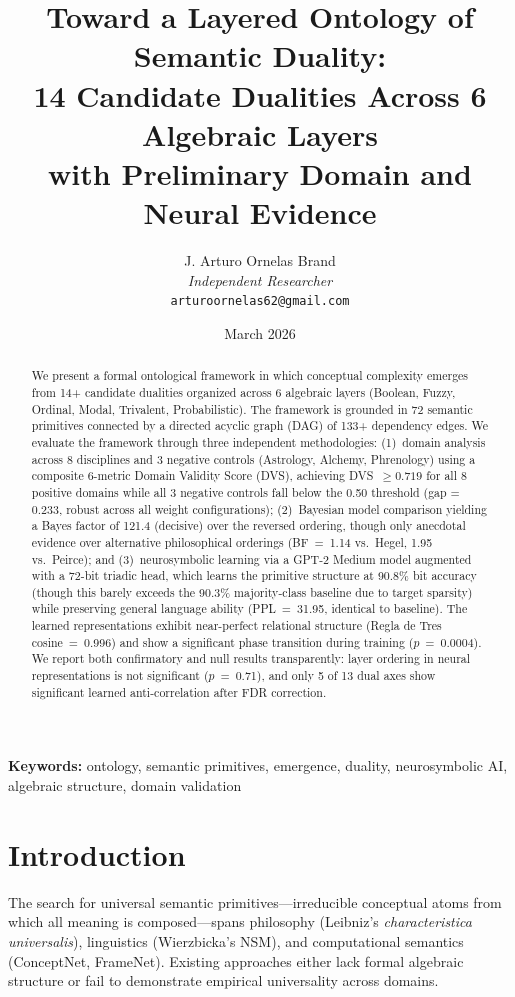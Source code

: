 \documentclass[11pt, a4paper]{article}
\title{\Large Toward a Layered Ontology of Semantic Duality:\\
14 Candidate Dualities Across 6 Algebraic Layers\\
with Preliminary Domain and Neural Evidence}
\author{
    J. Arturo Ornelas Brand \\
    \textit{Independent Researcher} \\
    \texttt{arturoornelas62@gmail.com}
}
\date{March 2026}
\begin{document}
\maketitle

\begin{abstract}
We present a formal ontological framework in which conceptual complexity emerges from 14+ candidate dualities organized across 6 algebraic layers (Boolean, Fuzzy, Ordinal, Modal, Trivalent, Probabilistic). The framework is grounded in 72 semantic primitives connected by a directed acyclic graph (DAG) of 133+ dependency edges. We evaluate the framework through three independent methodologies: (1)~domain analysis across 8 disciplines and 3 negative controls (Astrology, Alchemy, Phrenology) using a composite 6-metric Domain Validity Score (DVS), achieving DVS~$\geq 0.719$ for all 8 positive domains while all 3 negative controls fall below the 0.50 threshold (gap = 0.233, robust across all weight configurations); (2)~Bayesian model comparison yielding a Bayes factor of 121.4 (decisive) over the reversed ordering, though only anecdotal evidence over alternative philosophical orderings (BF~=~1.14 vs.\ Hegel, 1.95 vs.\ Peirce); and (3)~neurosymbolic learning via a GPT-2 Medium model augmented with a 72-bit triadic head, which learns the primitive structure at 90.8\% bit accuracy (though this barely exceeds the 90.3\% majority-class baseline due to target sparsity) while preserving general language ability (PPL~=~31.95, identical to baseline). The learned representations exhibit near-perfect relational structure (Regla de Tres cosine~=~0.996) and show a significant phase transition during training ($p$~=~0.0004). We report both confirmatory and null results transparently: layer ordering in neural representations is not significant ($p$~=~0.71), and only 5 of 13 dual axes show significant learned anti-correlation after FDR correction.
\end{abstract}

\noindent\textbf{Keywords:} ontology, semantic primitives, emergence, duality, neurosymbolic AI, algebraic structure, domain validation

\section{Introduction}

The search for universal semantic primitives---irreducible conceptual atoms from which all meaning is composed---spans philosophy (Leibniz's \emph{characteristica universalis}), linguistics (Wierz\-bic\-ka's NSM), and computational semantics (ConceptNet, FrameNet). Existing approaches either lack formal algebraic structure or fail to demonstrate empirical universality across domains.
\end{document}
